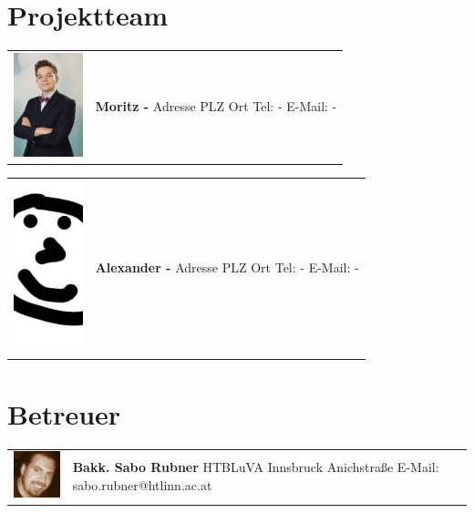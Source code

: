 \section*{Projektteam}


\begin{tabular}[t]{p{2cm} p{5cm}}
    \vspace{0pt}
    \includegraphics[width=2cm]{../images/moritz.jpg}
    &
    \vspace{0pt}
    \textbf{Moritz -}
    \newline Adresse
    \newline PLZ Ort
    \newline
    \newline Tel: -
    \newline E-Mail: -
    \\
\end{tabular}

\begin{tabular}[t]{p{2cm} p{5cm}}
    \vspace{0pt}
    \includegraphics[width=2cm]{../images/alex.jpg}
    &
    \vspace{0pt}
    \textbf{Alexander - }
    \newline Adresse
    \newline PLZ Ort
    \newline
    \newline Tel: -
    \newline E-Mail: -
    \\
\end{tabular}

\section*{Betreuer}

\begin{tabular}[t]{p{2cm} p{7cm}}
    \vspace{0pt}
    \includegraphics[width=2cm]{../images/sabo.jpg}
    &
    \vspace{0pt}
    \textbf{Bakk. Sabo Rubner}
    \newline HTBLuVA Innsbruck Anichstraße
    \newline
    \newline E-Mail: sabo.rubner@htlinn.ac.at
    \\
\end{tabular}

\newpage